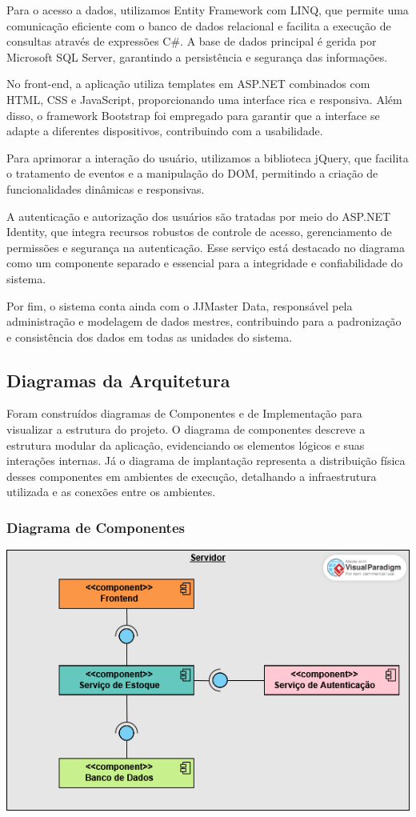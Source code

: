 \documentclass[
	12pt,				%
	openany,			%
	twoside,			%
	a4paper,			%
	english,			%
	brazil				%
	]{abntex2}
\begin{document}
Para o acesso a dados, utilizamos Entity Framework com LINQ, que permite uma comunicação eficiente com o banco de dados relacional e facilita a execução de consultas através de expressões C\#. A base de dados principal é gerida por Microsoft SQL Server, garantindo a persistência e segurança das informações.

No front-end, a aplicação utiliza templates em ASP.NET combinados com HTML, CSS e JavaScript, proporcionando uma interface rica e responsiva. Além disso, o framework Bootstrap foi empregado para garantir que a interface se adapte a diferentes dispositivos, contribuindo com a usabilidade.

Para aprimorar a interação do usuário, utilizamos a biblioteca jQuery, que facilita o tratamento de eventos e a manipulação do DOM, permitindo a criação de funcionalidades dinâmicas e responsivas.

A autenticação e autorização dos usuários são tratadas por meio do ASP.NET Identity, que integra recursos robustos de controle de acesso, gerenciamento de permissões e segurança na autenticação. Esse serviço está destacado no diagrama como um componente separado e essencial para a integridade e confiabilidade do sistema.

Por fim, o sistema conta ainda com o JJMaster Data, responsável pela administração e modelagem de dados mestres, contribuindo para a padronização e consistência dos dados em todas as unidades do sistema.

\subsection{Diagramas da Arquitetura}

Foram construídos diagramas de Componentes e de Implementação para visualizar a estrutura do projeto. O diagrama de componentes descreve a estrutura modular da aplicação, evidenciando os elementos lógicos e suas interações internas. Já o diagrama de implantação representa a distribuição física desses componentes em ambientes de execução, detalhando a infraestrutura utilizada e as conexões entre os ambientes.

\subsubsection{Diagrama de Componentes}

\includegraphics[width=1.0\textwidth]{Figuras/Componentes.png}
\end{document}
